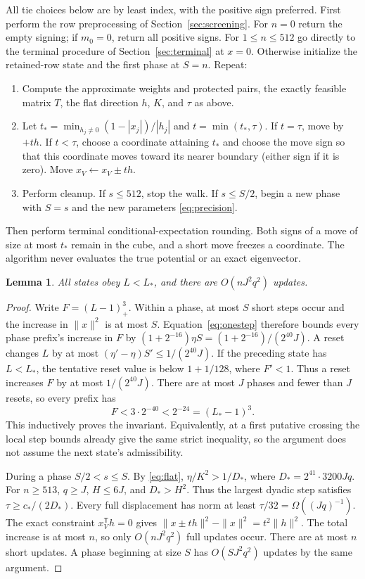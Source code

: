 \documentclass[11pt]{amsart}
\newtheorem{lemma}[theorem]{Lemma}
\theoremstyle{remark}\newtheorem{remark}[theorem]{Remark}
\newcommand{\T}{\mathsf T}
\begin{document}
All tie choices below are by least index, with the positive sign preferred.
First perform the row preprocessing of Section~\ref{sec:screening}.
For $n=0$ return the empty signing; if $m_0=0$, return all positive signs.
For $1\le n\le512$ go directly to the
terminal procedure of Section~\ref{sec:terminal} at $x=0$.
Otherwise initialize the retained-row state and the first phase at $S=n$.
Repeat:
\begin{enumerate}
\item Compute the approximate weights and protected pairs, the exactly
feasible matrix $T$, the flat direction $h$, $K$, and $\tau$ as above.
\item Let $t_*=\min_{h_j\ne0}(1-|x_j|)/|h_j|$ and
$t=\min(t_*,\tau)$. If $t=\tau$, move by $+th$.
If $t<\tau$, choose a coordinate attaining $t_*$ and choose the move sign
so that this coordinate moves toward its nearer boundary (either sign if
it is zero). Move $x_V\leftarrow x_V\pm th$.
\item Perform cleanup. If $s\le512$, stop the walk. If $s\le S/2$, begin
a new phase with $S=s$ and the new parameters \eqref{eq:precision}.
\end{enumerate}
Then perform terminal conditional-expectation rounding.
Both signs of a move of size at most $t_*$ remain in the cube, and a short
move freezes a coordinate. The algorithm never evaluates the true
potential or an exact eigenvector.

\begin{lemma}\label{lem:budget}
All states obey $L<L_*$, and there are $O(nJ^2q^2)$ updates.
\end{lemma}
\begin{proof}
Write $F=(L-1)_+^3$. Within a phase, at most $S$ short steps occur and
the increase in $\|x\|^2$ is at most $S$. Equation~\eqref{eq:onestep}
therefore bounds every phase prefix's increase in $F$ by
$(1+2^{-16})\eta S=(1+2^{-16})/(2^{40}J)$.
A reset changes $L$ by at most $(\eta'-\eta)S'\le1/(2^{40}J)$.
If the preceding state has $L<L_*$, the tentative reset value is below
$1+1/128$, where $F'<1$. Thus a reset increases $F$ by at most
$1/(2^{40}J)$. There are at most $J$ phases and fewer than $J$ resets,
so every prefix has
\[
 F<3\cdot2^{-40}<2^{-24}=(L_*-1)^3.
\]
This inductively proves the invariant. Equivalently, at a first putative
crossing the local step bounds already give the same strict inequality,
so the argument does not assume the next state's admissibility.

During a phase $S/2<s\le S$. By \eqref{eq:flat},
$\eta/K^2>1/D_*$, where $D_*=2^{41}\cdot3200Jq$.
For $n\ge513$, $q\ge J$, $H\le6J$, and $D_*>H^2$.
Thus the largest dyadic step satisfies $\tau\ge c_*/(2D_*)$.
Every full displacement has norm at least $\tau/32=\Omega((Jq)^{-1})$.
The exact constraint $x_V^\T h=0$ gives
$\|x\pm th\|^2-\|x\|^2=t^2\|h\|^2$.
The total increase is at most $n$, so only $O(nJ^2q^2)$ full updates occur.
There are at most $n$ short updates. A phase beginning at size $S$ has
$O(SJ^2q^2)$ updates by the same argument.
\end{proof}
\end{document}
